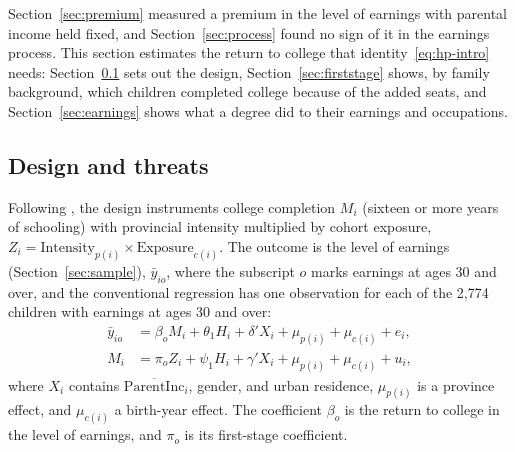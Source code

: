 \documentclass[11pt]{article}
\newcommand{\pinc}{\overline{\mathrm{ParentInc}}}
\begin{document}
Section~\ref{sec:premium} measured a premium in the level of earnings with parental income held fixed, and Section~\ref{sec:process} found no sign of it in the earnings process. This section estimates the return to college that identity~\eqref{eq:hp-intro} needs: Section~\ref{sec:design} sets out the design, Section~\ref{sec:firststage} shows, by family background, which children completed college because of the added seats, and Section~\ref{sec:earnings} shows what a degree did to their earnings and occupations.

\subsection{Design and threats}
\label{sec:design}

Following \citet{Duflo2001}, the design instruments college completion $M_i$ (sixteen or more years
of schooling) with provincial intensity multiplied by cohort exposure,
$Z_i = \mathrm{Intensity}_{p(i)} \times \mathrm{Exposure}_{c(i)}$. The outcome is the level of earnings (Section~\ref{sec:sample}), $\bar y_{io}$, where the subscript $o$ marks earnings at ages 30 and over, and the conventional regression has one observation for each of the 2,774 children with earnings at ages 30 and over:
\begin{equation}
\begin{aligned}
\bar y_{io} &= \beta_o M_i + \theta_1 H_i + \delta' X_i + \mu_{p(i)} + \mu_{c(i)} + e_{i}, \\
M_i &= \pi_o Z_i + \psi_1 H_i + \gamma' X_i + \mu_{p(i)} + \mu_{c(i)} + u_i,
\end{aligned}
\label{eq:oldonly}
\end{equation}
where $X_i$ contains $\pinc_i$, gender, and urban residence, $\mu_{p(i)}$ is a province effect, and $\mu_{c(i)}$ a birth-year effect. The coefficient $\beta_o$ is the return to college in the level of earnings, and $\pi_o$ is its first-stage coefficient.
\end{document}
